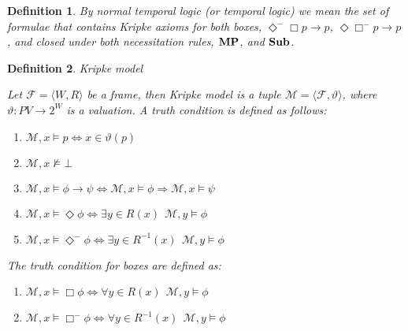 \documentclass[a4paper]{article}
\theoremstyle{defin}
\newtheorem{defin}{Definition}
\theoremstyle{theorem}
\theoremstyle{prop}
\theoremstyle{lemma}
\theoremstyle{ex}
\theoremstyle{col}
\newcommand{\BoxM}{\Box^{-}}
\newcommand{\DiamondM}{\Diamond^{-}}
\begin{document}
\begin{defin} By normal temporal logic (or temporal logic) we mean the set of formulae that contains Kripke axioms for both boxes, $\DiamondM \Box p \to p$, $\Diamond \BoxM p \to p$, and closed under both necessitation rules, ${\bf MP}$, and ${\bf Sub}$.
\end{defin}

\begin{defin} Kripke model

  Let $\mathcal{F} = \langle W, R \rangle$ be a frame, then Kripke model is a tuple $\mathcal{M} = \langle \mathcal{F}, \vartheta \rangle$, where $\vartheta : PV \to 2^W$ is a valuation. A truth condition is defined as follows:

  \begin{enumerate}
    \item $\mathcal{M}, x \models p \Leftrightarrow x \in \vartheta(p)$
    \item $\mathcal{M}, x \nvDash \bot$
    \item $\mathcal{M}, x \models \phi \to \psi \Leftrightarrow \mathcal{M}, x \models \phi \Rightarrow \mathcal{M}, x \models \psi$
    \item $\mathcal{M}, x \models \Diamond \phi \Leftrightarrow \exists y \in R(x) \:\: \mathcal{M}, y \models \phi$
    \item $\mathcal{M}, x \models \DiamondM \phi \Leftrightarrow \exists y \in R^{-1}(x) \:\: \mathcal{M}, y \models \phi$
  \end{enumerate}

  The truth condition for boxes are defined as:

  \begin{enumerate}
    \item $\mathcal{M}, x \models \Box \phi \Leftrightarrow \forall y \in R(x) \:\: \mathcal{M}, y \models \phi$
    \item $\mathcal{M}, x \models \BoxM \phi \Leftrightarrow \forall y \in R^{-1}(x) \:\: \mathcal{M}, y \models \phi$
  \end{enumerate}
\end{defin}
\end{document}
